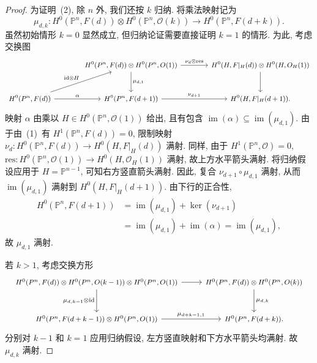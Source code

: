 \begin{proof}
为证明~(2), 除 $n$ 外, 我们还按 $k$ 归纳.
将乘法映射记为
\[
\mu_{d,k}:H^0(\mathbb P^n,F(d))\otimes H^0(\mathbb P^n,\mathcal O(k))
\longrightarrow H^0(\mathbb P^n,F(d+k)).
\]
虽然初始情形 $k=0$ 显然成立, 但归纳论证需要直接证明 $k=1$ 的情形.
为此, 考虑交换图
\begin{equation}\label{src:2.3.6}
\begin{tikzcd}[column sep=large,row sep=large,font=\small]
& H^0(\mathbb P^n,F(d))\otimes H^0(\mathbb P^n,\mathcal O(1))
\arrow[r,"\nu_d\otimes\mathrm{res}"]\arrow[d,"\mu_{d,1}"]&
H^0(H,F|_H(d))\otimes H^0(H,\mathcal O_H(1))\arrow[d]\\
H^0(\mathbb P^n,F(d))\arrow[r,"\alpha"]
\arrow[ur,"\mathrm{id}\otimes H"]&
H^0(\mathbb P^n,F(d+1))\arrow[r,"\nu_{d+1}"]&
H^0(H,F|_H(d+1)).
\end{tikzcd}
\end{equation}
映射 $\alpha$ 由乘以 $H\in H^0(\mathbb P^n,\mathcal O(1))$ 给出, 且有包含 $\operatorname{im}(\alpha)\subseteq\operatorname{im}(\mu_{d,1})$.
由于由~(1)~有 $H^1(\mathbb P^n,F(d))=0$, 限制映射 $\nu_d:H^0(\mathbb P^n,F(d))\to H^0(H,F|_H(d))$ 满射.
同样, 由于 $H^1(\mathbb P^n,\mathcal O)=0$, $\mathrm{res}:H^0(\mathbb P^n,\mathcal O(1))\to H^0(H,\mathcal O_H(1))$ 满射, 故上方水平箭头满射.
将归纳假设应用于 $H=\mathbb P^{n-1}$, 可知右方竖直箭头满射.
因此, 复合 $\nu_{d+1}\circ\mu_{d,1}$ 满射, 从而 $\operatorname{im}(\mu_{d,1})$ 满射到 $H^0(H,F|_H(d+1))$.
由下行的正合性, 
\[
\begin{aligned}
H^0(\mathbb P^n,F(d+1))
&=\operatorname{im}(\mu_{d,1})+\ker(\nu_{d+1})\\
&=\operatorname{im}(\mu_{d,1})+\operatorname{im}(\alpha)
=\operatorname{im}(\mu_{d,1}),
\end{aligned}
\]
故 $\mu_{d,1}$ 满射.

若 $k>1$, 考虑交换方形
\[
\begin{tikzcd}[column sep=normal,row sep=large,font=\footnotesize]
H^0(\mathbb P^n,F(d))\otimes H^0(\mathbb P^n,\mathcal O(k-1))
\otimes H^0(\mathbb P^n,\mathcal O(1))
\arrow[r]\arrow[d,"\mu_{d,k-1}\otimes\mathrm{id}"']&
H^0(\mathbb P^n,F(d))\otimes H^0(\mathbb P^n,\mathcal O(k))
\arrow[d,"\mu_{d,k}"]\\
H^0(\mathbb P^n,F(d+k-1))\otimes H^0(\mathbb P^n,\mathcal O(1))
\arrow[r,"\mu_{d+k-1,1}"]&
H^0(\mathbb P^n,F(d+k)).
\end{tikzcd}
\]
分别对 $k-1$ 和 $k=1$ 应用归纳假设, 左方竖直映射和下方水平箭头均满射.
故 $\mu_{d,k}$ 满射.


\end{proof}
